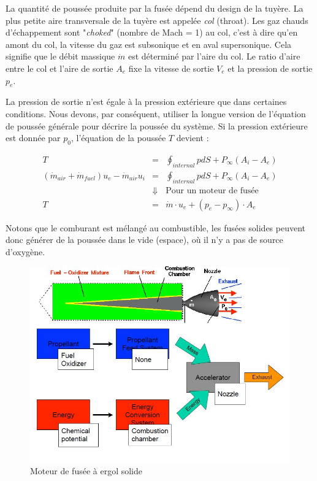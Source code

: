 \documentclass{report}
\begin{document}
La quantité de poussée produite par la fusée dépend du design de la tuyère. La plus petite aire transversale de la tuyère est appelée \textit{col} (throat). Les gaz chauds d'échappement sont "\textit{choked}" (nombre de Mach = 1) au col, c'est à dire qu'en amont du col, la vitesse du gaz est subsonique et en aval supersonique. Cela signifie que le débit massique $\dot{m}$ est déterminé par l'aire du col. Le ratio d'aire entre le col et l'aire de sortie $A_e$ fixe la vitesse de sortie $V_e$ et la pression de sortie $p_e$. 

La pression de sortie n'est égale à la pression extérieure que dans certaines conditions. Nous devons, par conséquent, utiliser la longue version de l'équation de poussée générale pour décrire la poussée du système. Si la pression extérieure est donnée par $p_0$, l'équation de la poussée $T$ devient :

\begin{eqnarray}
T &= &\oint_{internal}pdS+P_\infty (A_i-A_e)\\
(\dot{m}_{air}+\dot{m}_{fuel})u_e-\dot{m}_{air}u_i &= &\oint_{internal}pdS+P_\infty (A_i-A_e)\\
 & \Downarrow &\text{Pour un moteur de fusée}\\
T &= &\dot{m}\cdot u_e +(p_e-p_\infty)\cdot A_e
\end{eqnarray}

Notons que le comburant est mélangé au combustible, les fusées solides peuvent donc générer de la poussée dans le vide (espace), où il n'y a pas de source d'oxygène. 

\begin{figure}[h!]
    \centering
    \includegraphics[scale=0.6]{40.JPG}
    \caption{Moteur de fusée à ergol solide}
    \label{40}
\end{figure}
\end{document}
